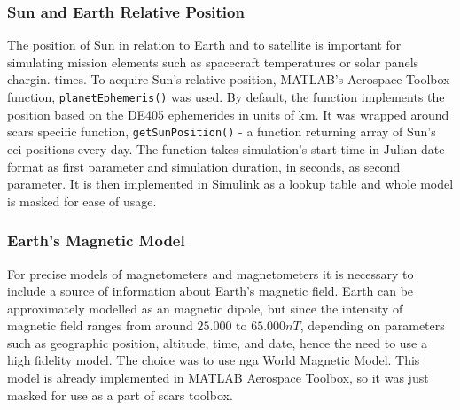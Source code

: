     \subsubsection{Sun and Earth Relative Position}
        The position of Sun in relation to Earth and to satellite is important for simulating mission elements such as spacecraft temperatures or solar panels chargin. times. To acquire Sun's relative position, MATLAB's Aerospace Toolbox function, \verb|planetEphemeris()| was used. By default, the function implements the position based on the DE405 ephemerides in units of km. It was wrapped around \ac{scars} specific function, \verb|getSunPosition()| - a function returning array of Sun's \ac{eci} positions every day. The function takes simulation's start time in Julian date format as first parameter and simulation duration, in seconds, as second parameter. It is then implemented in Simulink as a lookup table and whole model is masked for ease of usage.

    \subsubsection{Earth's Magnetic Model}
        For precise models of magnetometers and magnetometers it is necessary to include a source of information about Earth's magnetic field. Earth can be approximately modelled as an magnetic dipole, but since the intensity of magnetic field ranges from around $25.000$ to $65.000 nT$, depending on parameters such as geographic position, altitude, time, and date, hence the need to use a high fidelity model. The choice was to use \ac{nga} World Magnetic Model. This model is already implemented in MATLAB Aerospace Toolbox, so it was just masked for use as a part of \ac{scars} toolbox.
 